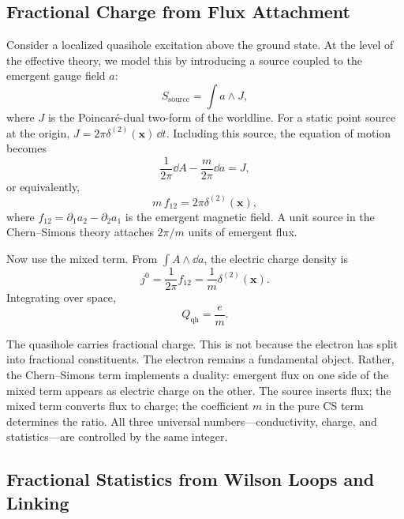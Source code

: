 \subsection{Fractional Charge from Flux Attachment}
\label{subsec:fqhe-fractional-charge}

Consider a localized quasihole excitation above the ground state. At the level of the effective theory, we model this by introducing a source coupled to the emergent gauge field $a$:
\begin{equation}
  S_{\mathrm{source}} = \int a \wedge J,
  \label{eq:fqhe-source}
\end{equation}
where $J$ is the Poincaré-dual two-form of the worldline. For a static point source at the origin, $J = 2\pi\delta^{(2)}(\mathbf{x})\,\dd t$. Including this source, the equation of motion becomes
\begin{equation}
  \frac{1}{2\pi}\dd A - \frac{m}{2\pi}\dd a = J,
  \label{eq:fqhe-eom-source}
\end{equation}
or equivalently,
\begin{equation}
  m\,f_{12} = 2\pi\delta^{(2)}(\mathbf{x}),
  \label{eq:fqhe-flux-attachment}
\end{equation}
where $f_{12}=\partial_1 a_2-\partial_2 a_1$ is the emergent magnetic field. A unit source in the Chern--Simons theory attaches $2\pi/m$ units of emergent flux.

Now use the mixed term. From $\int A\wedge\dd a$, the electric charge density is
\begin{equation}
  j^0 = \frac{1}{2\pi}f_{12} = \frac{1}{m}\delta^{(2)}(\mathbf{x}).
  \label{eq:fqhe-charge-density}
\end{equation}
Integrating over space,
\begin{equation}
  Q_{\mathrm{qh}} = \frac{e}{m}.
  \label{eq:fqhe-fractional-charge}
\end{equation}

The quasihole carries fractional charge. This is not because the electron has split into fractional constituents. The electron remains a fundamental object. Rather, the Chern--Simons term implements a duality: emergent flux on one side of the mixed term appears as electric charge on the other. The source inserts flux; the mixed term converts flux to charge; the coefficient $m$ in the pure CS term determines the ratio. All three universal numbers---conductivity, charge, and statistics---are controlled by the same integer.

\subsection{Fractional Statistics from Wilson Loops and Linking}
\label{subsec:fqhe-statistics}

